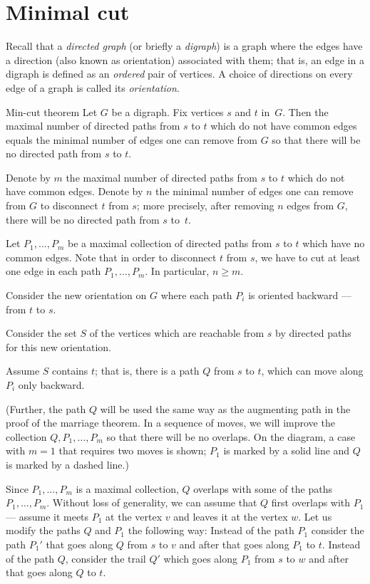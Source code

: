 \section{Minimal cut}

Recall that a \emph{directed graph} (or briefly a \emph{digraph})
is a graph where the edges have a direction (also known as orientation) associated with them;
that is, an edge in a digraph is defined as an \textit{ordered} pair of vertices.
A choice of directions on every edge of a graph is called its \emph{orientation}.


\begin{thm}{Min-cut theorem}\label{thm:mincut}
Let $G$ be a digraph. 
Fix vertices $s$ and $t$ in~$G$.
Then the maximal number of directed paths from $s$ to $t$ which do not have common edges equals the minimal number of edges one can remove from $G$ so that there will be no directed path from $s$ to $t$.
\end{thm}

Denote by $m$ the maximal number of directed paths from $s$ to $t$ which do not have common edges.
Denote by $n$ the minimal number of edges one can remove from $G$ to disconnect $t$ from $s$; more precisely, after removing $n$ edges from $G$, there will be no directed path from $s$ to~$t$.

Let $P_1, \dots, P_m$ be a maximal collection of directed paths from $s$ to $t$ which have no common edges.
Note that in order to disconnect $t$ from $s$, we have to cut at least one edge in each path $P_1, \dots, P_m$.
In particular, $n\ge m$.

Consider the new orientation on $G$ where each path $P_i$ is oriented backward --- from $t$ to $s$.

Consider the set $S$ of the vertices which are reachable from $s$ by directed paths for this new orientation.

Assume $S$ contains $t$; that is, there is a path $Q$ from $s$ to $t$, which
can move along $P_i$ only backward.


(Further, the path $Q$ will be used the same way as the augmenting path in the proof of the marriage theorem.
In a sequence of moves, we will improve the collection $Q,P_1,\dots,P_m$ so that there will be no overlaps.
On the diagram, a case with $m=1$ that requires two moves is shown;
$P_1$ is marked by a solid line and $Q$ is marked by a dashed line.)

Since $P_1,\dots,P_m$ is a maximal collection, $Q$ overlaps with some of the paths $P_1,\dots,P_m$.
Without loss of generality, we can assume that $Q$ first overlaps with $P_1$ --- assume it meets $P_1$ at the vertex $v$ and leaves it at the vertex $w$.
Let us modify the paths $Q$ and $P_1$ the following way:
Instead of the path $P_1$ consider the path $P_1'$ that goes along $Q$ from $s$ to $v$ and after that goes along $P_1$ to $t$.
Instead of the path $Q$, consider the trail $Q'$ which goes along $P_1$ from $s$ to $w$ and after that goes along $Q$ to $t$.


